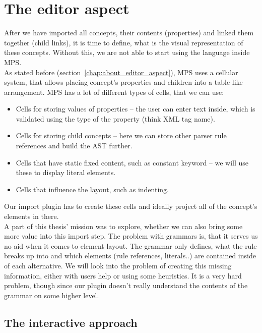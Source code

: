 \section{The editor aspect}
\label{chap:editor_aspect}

After we have imported all concepts, their contents (properties) and linked them together (child links), it is time to define, what is the visual representation of these concepts.
Without this, we are not able to start using the language inside MPS.
\\

As stated before (section~\ref{chap:about_editor_aspect}), MPS uses a cellular system, that allows placing concept's properties and children into a table-like arrangement.
MPS has a lot of different types of cells, that we can use:

\begin{itemize}
	\item Cells for storing values of properties -- the user can enter text inside, which is validated using the type of the property (think XML tag name).

	\item Cells for storing child concepts -- here we can store other parser rule references and build the AST further.

	\item Cells that have static fixed content, such as constant keyword -- we will use these to display literal elements.

	\item Cells that influence the layout, such as indenting.
\end{itemize}

Our import plugin has to create these cells and ideally project all of the concept's elements in there.
\\

A part of this thesis' mission was to explore, whether we can also bring some more value into this import step.
The problem with grammars is, that it serves us no aid when it comes to element layout.
The grammar only defines, what the rule breaks up into and which elements (rule references, literals..) are contained inside of each alternative.
We will look into the problem of creating this missing information, either with users help or using some heuristics.
It is a very hard problem, though since our plugin doesn't really understand the contents of the grammar on some higher level.

\subsection{The interactive approach}

